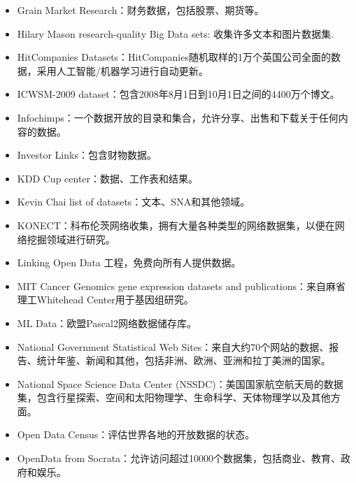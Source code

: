 \documentclass[letterpaper,10pt,english]{sphinxmanual}
\begin{document}
\begin{itemize}
\item {} 
Grain Market Research：财务数据，包括股票、期货等。

\item {} 
Hilary Mason research-quality Big Data sets: 收集许多文本和图片数据集.

\item {} 
HitCompanies Datasets：HitCompanies随机取样的1万个英国公司全面的数据，采用人工智能/机器学习进行自动更新。

\item {} 
ICWSM-2009 dataset：包含2008年8月1日到10月1日之间的4400万个博文。

\item {} 
Infochimps：一个数据开放的目录和集合，允许分享、出售和下载关于任何内容的数据。

\item {} 
Investor Links：包含财物数据。

\item {} 
KDD Cup center：数据、工作表和结果。

\item {} 
Kevin Chai list of datasets：文本、SNA和其他领域。

\item {} 
KONECT：科布伦茨网络收集，拥有大量各种类型的网络数据集，以便在网络挖掘领域进行研究。

\item {} 
Linking Open Data 工程，免费向所有人提供数据。

\item {} 
MIT Cancer Genomics gene expression datasets and publications：来自麻省理工Whitehead Center用于基因组研究。

\item {} 
ML Data：欧盟Pascal2网络数据储存库。

\item {} 
National Government Statistical Web Sites：来自大约70个网站的数据、报告、统计年鉴、新闻和其他，包括非洲、欧洲、亚洲和拉丁美洲的国家。

\item {} 
National Space Science Data Center (NSSDC)：美国国家航空航天局的数据集，包含行星探索、空间和太阳物理学、生命科学、天体物理学以及其他方面。

\item {} 
Open Data Census：评估世界各地的开放数据的状态。

\item {} 
OpenData from Socrata：允许访问超过10000个数据集，包括商业、教育、政府和娱乐。


\end{itemize}
\end{document}
